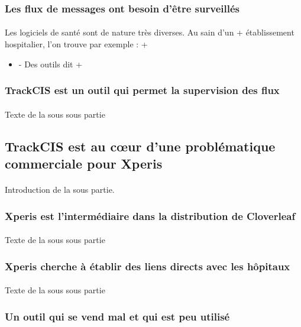 		\subsubsection{Les flux de messages ont besoin d'être surveillés}
			\paragraph{}
			Les logiciels de santé sont de nature très diverses. Au sain d'un
 +			établissement hospitalier, l'on trouve par exemple :
 +			\begin{itemize}
 +			  \item{-} Des outils dit 
 +			\end{itemize}
		\subsubsection{TrackCIS est un outil qui permet la supervision des flux}
			\paragraph{}
			Texte de la sous sous partie
	
	\subsection{TrackCIS est au cœur d'une problématique commerciale pour Xperis}
		\paragraph{}
		Introduction de la sous partie.
		
		\subsubsection{Xperis est l'intermédiaire dans la distribution de Cloverleaf}
			\paragraph{}
			Texte de la sous sous partie
		\subsubsection{Xperis cherche à établir des liens directs avec les hôpitaux}
			\paragraph{}
			Texte de la sous sous partie
		\subsubsection{Un outil qui se vend mal et qui est peu utilisé}
